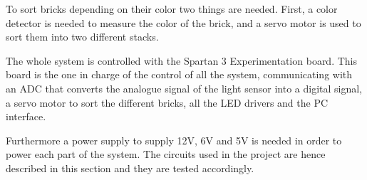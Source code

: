 To sort bricks depending on their color two things are needed. 
First, a color detector is needed to measure the color of the brick, and a servo motor is used to sort them into two different stacks.

The whole system is controlled with the Spartan 3 Experimentation board.
This board is the one in charge of the control of all the system, communicating with an ADC that converts the analogue signal of the light sensor into a digital signal, a servo motor to sort the different bricks, all the LED drivers and the PC interface.

Furthermore a power supply to supply 12V, 6V and 5V is needed in order to power each part of the system.
The circuits used in the project are hence described in this section and they are tested accordingly.
